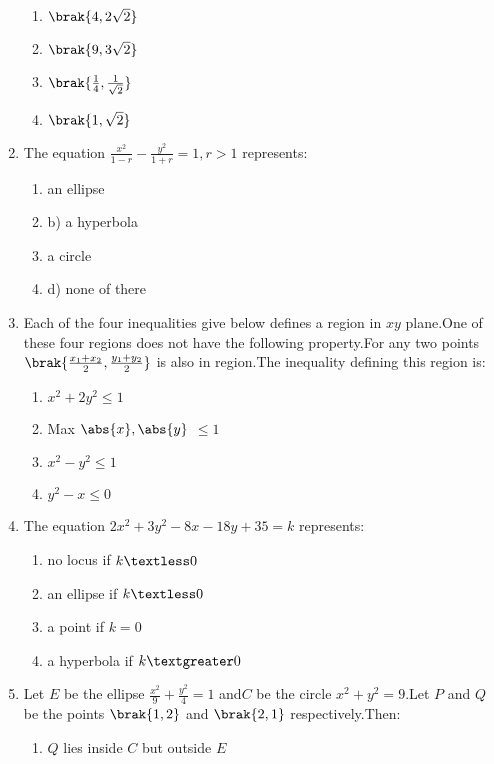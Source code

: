 \begin{enumerate}
		 \begin{enumerate}
			\item $ \brak{4,2\sqrt{2}}$
			\item $\brak{9,3\sqrt{2}}$
			\item $ \brak{\frac{1}{4},\frac{1}{\sqrt{2}}}$
			\item  $ \brak{1,\sqrt{2}}$
		 \end{enumerate}
    \item The equation $\frac{x^2}{1-r}-\frac{y^2}{1+r}=1,r > 1$
represents:
          \hfill  {}
\begin{enumerate}
    \item an ellipse    \item      b)   a hyperbola
   \item a circle     \item   d) none of there 
\end{enumerate}
\item Each of the four inequalities give below defines a region in $xy$ plane.One of these four regions does not have the following property.For any two points   $\brak{\frac{x_1+x_2}{2},\frac{y_1+y_2}{2}}$   is also in region.The inequality defining this region is:
         \hfill {}
\begin{enumerate}
    \item $x^2+2y^2\le1$
    \item Max $\abs{x},\abs{y}$ $\le1$
    \item $x^2-y^2\le1$
    \item $y^2-x\le0$
\end{enumerate}
\item The equation $2x^2+3y^2-8x-18y+35=k$ represents:
        \hfill {}
\begin{enumerate}
    \item no locus if $k\textless0$
    \item an ellipse if $k\textless0$
    \item a point if $k=0$
    \item a hyperbola if $k\textgreater0$ 
\end{enumerate}
\item Let $E$ be the ellipse $\frac{x^2}{9}+\frac{y^2}{4}=1$ and$C$ be the circle $x^2+y^2=9$.Let $P$ and $Q$ be the points $\brak{1,2}$ and $\brak{2,1}$ respectively.Then: 
        \hfill {}
\begin{enumerate}
    \item $Q$ lies inside $C$ but outside $E$

\end{enumerate}
\end{enumerate}

